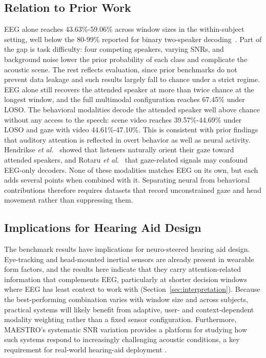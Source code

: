 \documentclass[journal]{IEEEtran}
\begin{document}
\subsection{Relation to Prior Work}
EEG alone reaches 43.63\%-59.06\% across window sizes in the within-subject setting, well below the 80-99\% reported for binary two-speaker decoding~\cite{neurotoken2026}. Part of the gap is task difficulty: four competing speakers, varying SNRs, and background noise lower the prior probability of each class and complicate the acoustic scene. The rest reflects evaluation, since prior benchmarks do not prevent data leakage and such results largely fall to chance under a strict regime. EEG alone still recovers the attended speaker at more than twice chance at the longest window, and the full multimodal configuration reaches 67.45\% under LOSO. The behavioral modalities decode the attended speaker well above chance without any access to the speech: scene video reaches 39.57\%-44.69\% under LOSO and gaze with video 44.61\%-47.10\%. This is consistent with prior findings that auditory attention is reflected in overt behavior as well as neural activity. Hendrikse \textit{et al.}~\cite{hendrikse2019} showed that listeners naturally orient their gaze toward attended speakers, and Rotaru \textit{et al.}~\cite{rotaru2024} that gaze-related signals may confound EEG-only decoders. None of these modalities matches EEG on its own, but each adds several points when combined with it. Separating neural from behavioral contributions therefore requires datasets that record unconstrained gaze and head movement rather than suppressing them.


\subsection{Implications for Hearing Aid Design}
The benchmark results have implications for neuro-steered hearing aid design. Eye-tracking and head-mounted inertial sensors are already present in wearable form factors, and the results here indicate that they carry attention-related information that complements EEG, particularly at shorter decision windows where EEG has least context to work with (Section~\ref{sec:interpretation}). Because the best-performing combination varies with window size and across subjects, practical systems will likely benefit from adaptive, user- and context-dependent modality weighting rather than a fixed sensor configuration. Furthermore, MAESTRO's systematic SNR variation provides a platform for studying how such systems respond to increasingly challenging acoustic conditions, a key requirement for real-world hearing-aid deployment \cite{smeds2015estimation}.
\end{document}
